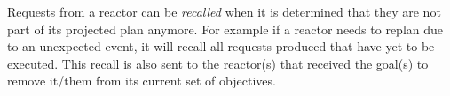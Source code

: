 
Requests from a reactor can be {\em recalled} when it is determined
that they are not part of its projected plan anymore. For example if a
reactor needs to replan due to an unexpected event, it will recall all
requests produced that have yet to be executed.  This recall is also
sent to the reactor(s) that received the goal(s) to remove it/them
from its current set of objectives.


